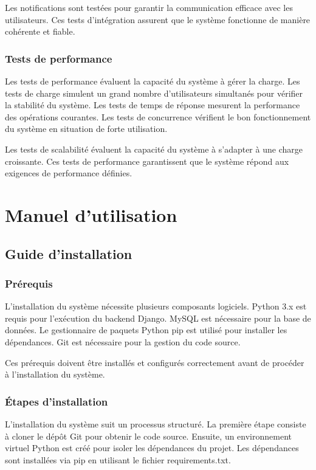 \documentclass[12pt,a4paper]{report}
\begin{document}
Les notifications sont testées pour garantir la communication efficace avec les utilisateurs. Ces tests d'intégration assurent que le système fonctionne de manière cohérente et fiable.

\subsection{Tests de performance}
Les tests de performance évaluent la capacité du système à gérer la charge. Les tests de charge simulent un grand nombre d'utilisateurs simultanés pour vérifier la stabilité du système. Les tests de temps de réponse mesurent la performance des opérations courantes. Les tests de concurrence vérifient le bon fonctionnement du système en situation de forte utilisation.

Les tests de scalabilité évaluent la capacité du système à s'adapter à une charge croissante. Ces tests de performance garantissent que le système répond aux exigences de performance définies.

\chapter{Manuel d'utilisation}
\section{Guide d'installation}
\subsection{Prérequis}
L'installation du système nécessite plusieurs composants logiciels. Python 3.x est requis pour l'exécution du backend Django. MySQL est nécessaire pour la base de données. Le gestionnaire de paquets Python pip est utilisé pour installer les dépendances. Git est nécessaire pour la gestion du code source.

Ces prérequis doivent être installés et configurés correctement avant de procéder à l'installation du système.

\subsection{Étapes d'installation}
L'installation du système suit un processus structuré. La première étape consiste à cloner le dépôt Git pour obtenir le code source. Ensuite, un environnement virtuel Python est créé pour isoler les dépendances du projet. Les dépendances sont installées via pip en utilisant le fichier requirements.txt.
\end{document}
